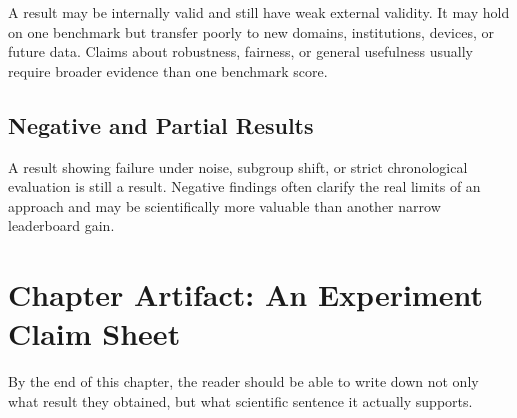 A result may be internally valid and still have weak external validity. It may hold on one benchmark but transfer poorly to new domains, institutions, devices, or future data. Claims about robustness, fairness, or general usefulness usually require broader evidence than one benchmark score.

\subsection{Negative and Partial Results}

A result showing failure under noise, subgroup shift, or strict chronological evaluation is still a result. Negative findings often clarify the real limits of an approach and may be scientifically more valuable than another narrow leaderboard gain.

\section{Chapter Artifact: An Experiment Claim Sheet}

By the end of this chapter, the reader should be able to write down not only what result they obtained, but what scientific sentence it actually supports.

